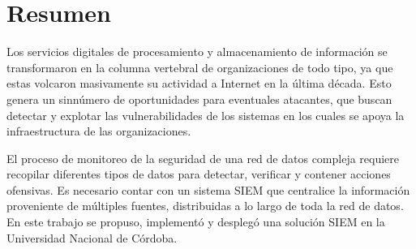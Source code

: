 \chapter*{\Large Resumen}

Los servicios digitales de procesamiento y almacenamiento de información se transformaron en la columna vertebral de organizaciones de todo tipo, ya que estas volcaron masivamente su actividad a Internet en la última década. Esto genera un sinnúmero de oportunidades para eventuales atacantes, que buscan detectar y explotar las vulnerabilidades de los sistemas en los cuales se apoya la infraestructura de las organizaciones. \par
El proceso de monitoreo de la seguridad de una red de datos compleja requiere recopilar diferentes tipos de datos para detectar, verificar y contener acciones ofensivas. Es necesario contar con un sistema SIEM que centralice la información proveniente de múltiples fuentes, distribuidas a lo largo de toda la red de datos. En este trabajo se propuso, implementó y desplegó una solución SIEM en la Universidad Nacional de Córdoba.\par
















